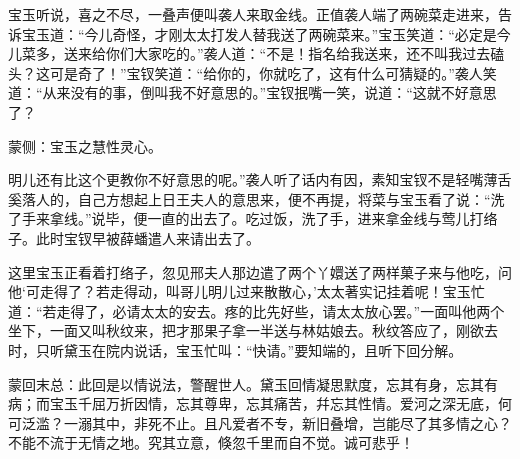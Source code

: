 \begin{parag}
    宝玉听说，喜之不尽，一叠声便叫袭人来取金线。正值袭人端了两碗菜走进来，告诉宝玉道：“今儿奇怪，才刚太太打发人替我送了两碗菜来。”宝玉笑道：“必定是今儿菜多，送来给你们大家吃的。”袭人道：“不是！指名给我送来，还不叫我过去磕头？这可是奇了！”宝钗笑道：“给你的，你就吃了，这有什么可猜疑的。”袭人笑道：“从来没有的事，倒叫我不好意思的。”宝钗抿嘴一笑，说道：“这就不好意思了？\begin{note}蒙侧：宝玉之慧性灵心。\end{note}明儿还有比这个更教你不好意思的呢。”袭人听了话内有因，素知宝钗不是轻嘴薄舌奚落人的，自己方想起上日王夫人的意思来，便不再提，将菜与宝玉看了说：“洗了手来拿线。”说毕，便一直的出去了。吃过饭，洗了手，进来拿金线与莺儿打络子。此时宝钗早被薛蟠遣人来请出去了。
\end{parag}


\begin{parag}
    这里宝玉正看着打络子，忽见邢夫人那边遣了两个丫嬛送了两样菓子来与他吃，问他‘可走得了？若走得动，叫哥儿明儿过来散散心，’太太著实记挂着呢！宝玉忙道：“若走得了，必请太太的安去。疼的比先好些，请太太放心罢。”一面叫他两个坐下，一面又叫秋纹来，把才那果子拿一半送与林姑娘去。秋纹答应了，刚欲去时，只听黛玉在院内说话，宝玉忙叫：“快请。”要知端的，且听下回分解。
\end{parag}


\begin{parag}
    \begin{note}蒙回末总：此回是以情说法，警醒世人。黛玉回情凝思默度，忘其有身，忘其有病；而宝玉千屈万折因情，忘其尊卑，忘其痛苦，幷忘其性情。爱河之深无底，何可泛滥？一溺其中，非死不止。且凡爱者不专，新旧叠增，岂能尽了其多情之心？不能不流于无情之地。究其立意，倏忽千里而自不觉。诚可悲乎！\end{note}
\end{parag}


